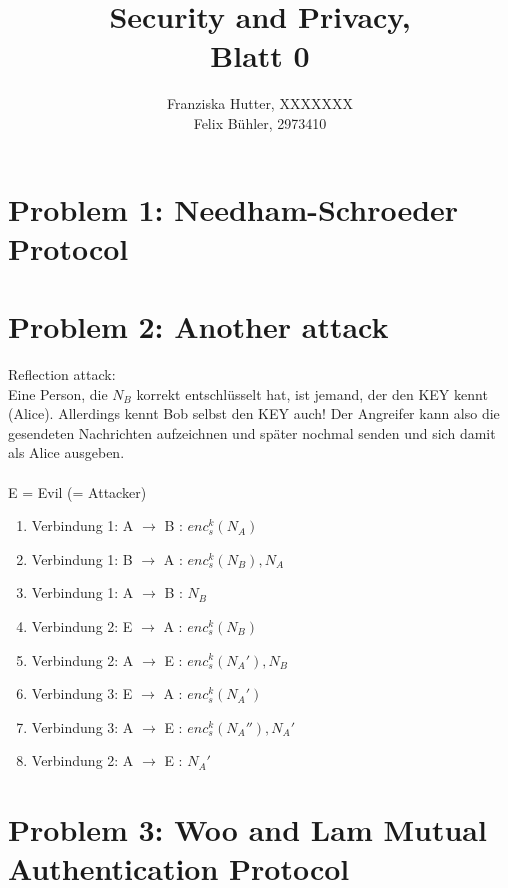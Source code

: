 \documentclass[12pt,pdftex,a4paper]{article}
\title{Security and Privacy,\\ Blatt 0}
\author{Franziska Hutter, XXXXXXX\\
	Felix Bühler, 2973410}
\newcommand\tab[1][1cm]{\hspace*{#1}}
\begin{document}
\maketitle
\pagebreak

\section*{Problem 1: Needham-Schroeder Protocol}

\section*{Problem 2: Another attack}
Reflection attack:\\
Eine Person, die $ N_B $ korrekt entschlüsselt hat, ist jemand, der den KEY kennt (Alice). Allerdings kennt Bob selbst den KEY auch! Der Angreifer kann also die gesendeten Nachrichten aufzeichnen und später nochmal senden und sich damit als Alice ausgeben.
\\~\\
E = Evil (= Attacker)
\begin{enumerate}
	\item Verbindung 1: A $ \rightarrow $ B \tab : $ enc_s^k(N_A) $
	\item Verbindung 1: B $ \rightarrow $ A \tab : $ enc_s^k(N_B), N_A $
	\item Verbindung 1: A $ \rightarrow $ B \tab : $ N_B $
	\setlength{\itemsep}{20pt}
	\item Verbindung 2: E $ \rightarrow $ A \tab : $ enc_s^k(N_B) $
	\setlength{\itemsep}{5pt}
	\item Verbindung 2: A $ \rightarrow $ E \tab : $ enc_s^k(N_A'), N_B $
	\item Verbindung 3: E $ \rightarrow $ A \tab : $ enc_s^k(N_A') $
	\item Verbindung 3: A $ \rightarrow $ E \tab : $ enc_s^k(N_A''), N_A' $
	\item Verbindung 2: A $ \rightarrow $ E \tab : $ N_A' $
\end{enumerate}
\section*{Problem 3: Woo and Lam Mutual Authentication Protocol}
\end{document}
